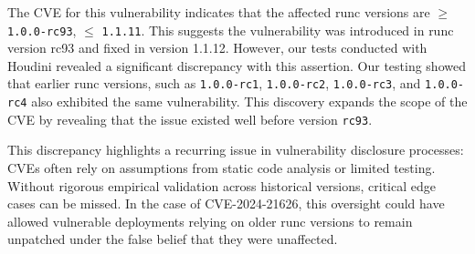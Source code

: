 \documentclass[12pt]{report}
\begin{document}
\begin{doublespace}
The CVE for this vulnerability indicates that the affected runc versions are $\geq$ \texttt{1.0.0-rc93}, $\leq$ \texttt{1.1.11}. This suggests the vulnerability was introduced in runc version rc93 and fixed in version 1.1.12. However, our tests conducted with Houdini revealed a significant discrepancy with this assertion. Our testing showed that earlier runc versions, such as \texttt{1.0.0-rc1}, \texttt{1.0.0-rc2}, \texttt{1.0.0-rc3}, and \texttt{1.0.0-rc4} also exhibited the same vulnerability. This discovery expands the scope of the CVE by revealing that the issue existed well before version \texttt{rc93}.

This discrepancy highlights a recurring issue in vulnerability disclosure processes: CVEs often rely on assumptions from static code analysis or limited testing. Without rigorous empirical validation across historical versions, critical edge cases can be missed. In the case of CVE-2024-21626, this oversight could have allowed vulnerable deployments relying on older runc versions to remain unpatched under the false belief that they were unaffected.



\end{doublespace}
\end{document}
